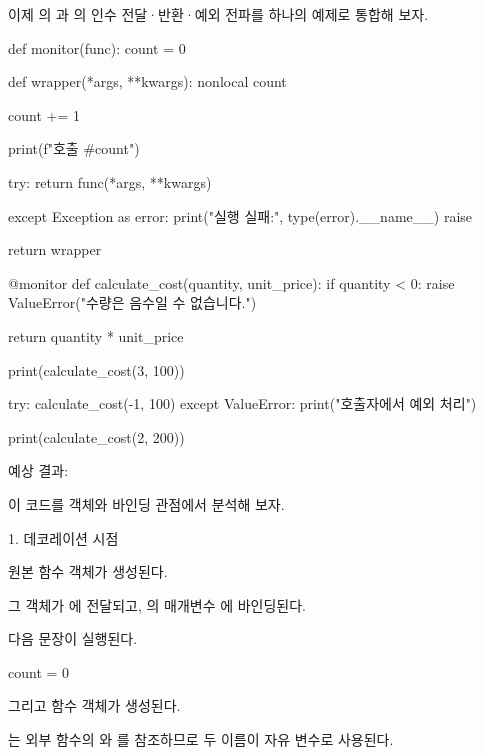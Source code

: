 이제 의 과 의 인수 전달·반환·예외 전파를 하나의 예제로 통합해 보자.

\begin{dhkcode}
def monitor(func):
    count = 0

    def wrapper(*args, **kwargs):
        nonlocal count

        count += 1

        print(f"호출 #{count}")

        try:
            return func(*args, **kwargs)

        except Exception as error:
            print("실행 실패:", type(error).__name__)
            raise

    return wrapper


@monitor
def calculate_cost(quantity, unit_price):
    if quantity < 0:
        raise ValueError("수량은 음수일 수 없습니다.")

    return quantity * unit_price


print(calculate_cost(3, 100))

try:
    calculate_cost(-1, 100)
except ValueError:
    print("호출자에서 예외 처리")

print(calculate_cost(2, 200))
\end{dhkcode}

예상 결과:


이 코드를 객체와 바인딩 관점에서 분석해 보자.

\begin{dhknote}
\begin{dhksmry}[centered]
1. 데코레이션 시점
\end{dhksmry}
\end{dhknote}

 원본 함수 객체가 생성된다.

그 객체가 에 전달되고, 의 매개변수 에 바인딩된다.

다음 문장이 실행된다.

\begin{dhkcode}
count = 0
\end{dhkcode}

그리고  함수 객체가 생성된다.

는 외부 함수의 와 를 참조하므로 두 이름이 자유 변수로 사용된다.

